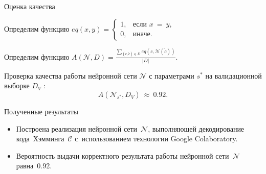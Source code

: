 \documentclass{beamer}
\begin{document}
\begin{frame}{Оценка качества}

\begin{block}{}
Определим функцию $eq(x, y) =
    \begin{cases}
            1, & \mbox{если } x~=~y, \\
        0, & \mbox{иначе}.
    \end{cases} $
\end{block}    

\begin{block}{}
Определим функцию $A(\mathcal{N}, D) = \frac{\sum\limits_{(c, \widetilde{c})\in D}eq(c, \mathcal{N}(\widetilde{c}))}{|D|}$.
\end{block}

\begin{block}{}
Проверка качества работы нейронной сети $\mathcal{N}$ с параметрами $s^*$ на валидационной выборке $D_V$ :
$$ A(\mathcal{N}_{s^*}, D_V)~\approx~0.92. $$

\end{block}
\end{frame}








\begin{frame}{Полученные результаты}

 \begin{itemize}
  \item {
    Построена реализация нейронной сети~$\mathcal{N}$, выполняющей декодирование кода~Хэмминга~$\mathcal{C}$ с~использованием технологии Google Colaboratory.
  }
  \item {
    Вероятность выдачи корректного результата работы нейронной сети~$\mathcal{N}$ равна~0.92.
  }
  \end{itemize}

\end{frame}
\end{document}
